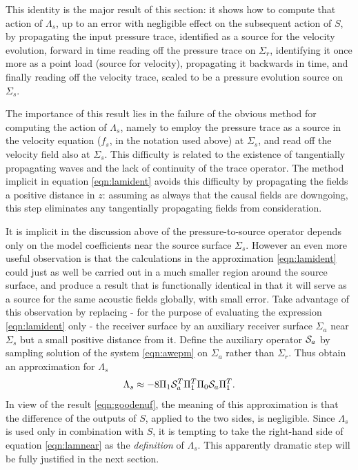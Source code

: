 \documentclass[12pt]{geophysics}
\begin{document}
This identity is the major result of this section: it shows how
to compute that action of $\Lambda_s$, up to an error with negligible
effect on the subsequent
action of $S$, by propagating the input
pressure trace, identified as a source for the velocity evolution,
forward in time 
reading off the pressure trace on $\Sigma_r$, identifying it once more as
a point load (source for velocity), propagating it backwards in time, and finally reading off the velocity trace, scaled to be a
pressure evolution source on $\Sigma_s$. 

The importance of this result lies in the failure of the obvious
method for computing the action of $\Lambda_s$, namely to
employ the pressure trace as a source in the velocity equation ($f_s$,
in the notation used above) at $\Sigma_s$, and read off the velocity
field also at $\Sigma_s$. This difficulty is related to the existence of
tangentially propagating waves and the lack of continuity of the trace
operator. The method implicit in equation \ref{eqn:lamident} avoids
this difficulty by propagating the fields a positive distance in $z$:
assuming as always that the causal fields are downgoing, this step
eliminates any tangentially propagating fields from consideration.

It is implicit in the discussion above of the pressure-to-source operator 
depends only on the model coefficients near the source surface
$\Sigma_s$. However an even more useful
observation is that the calculations in the approximation
\ref{eqn:lamident} could just as well be carried out in a much smaller
region around the source surface, and produce a result that is
functionally identical in that it will serve as a source for the same
acoustic fields globally, with small error. Take advantage of this
observation by replacing - for the purpose of evaluating the
expression \ref{eqn:lamident} only -  the receiver surface by an
auxiliary receiver surface $\Sigma_a$ near $\Sigma_s$ but a small positive
distance from it. Define the auxiliary operator ${\cal S}_a$ by
sampling solution of the system \ref{eqn:awepm} on $\Sigma_a$ rather
than $\Sigma_r$. Thus obtain an approximation for $\Lambda_s$
\begin{equation}
  \label{eqn:lamnear}
 \Lambda_s \approx -8\Pi_1{\cal S}_a^T\Pi_1^T\Pi_0 {\cal S}_a\Pi_1^T. 
\end{equation}
In view of the result \ref{eqn:goodenuf}, the meaning of this
approximation is that the difference of the outputs of $S$, applied to
the two sides, is negligible. Since $\Lambda_s$ is used only in
combination with $S$, it is tempting to take the right-hand side of
equation \ref{eqn:lamnear} as the {\em definition} of $\Lambda_s$. This
apparently dramatic step will be fully justified in the next section.
\end{document}

